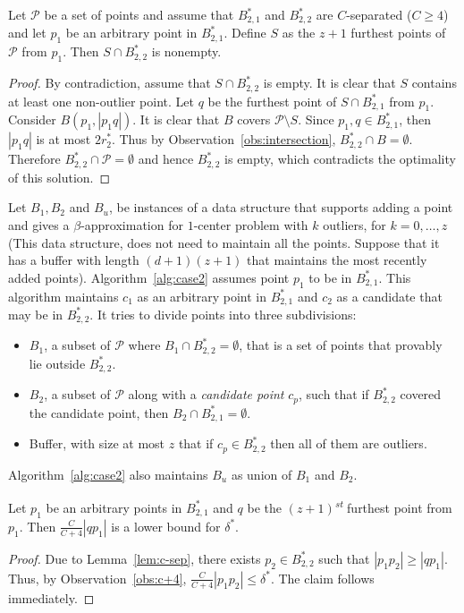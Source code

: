 \documentclass[envcountsame]{cls/cccg15}
\newcommand{\st}{\textsuperscript{\textit{st}} }
\newcommand{\card}[1]{\left|{#1}\right|}
\newcommand{\lee}{\leqslant}
\newcommand{\gee}{\geqslant}
\renewcommand{\le}{\lee}
\renewcommand{\ge}{\gee}
\begin{document}
\begin{lemma}
\label{lem:c-sep}
Let $\mathcal{P}$ be a set of points and assume that $B_{2,1}^*$ and $B_{2,2}^*$ are $C$-separated ($C \ge 4$) and let $p_1$ be an arbitrary point in $B_{2,1}^*$. Define $S$ as the $z+1$ furthest points of $\mathcal{P}$ from $p_1$. Then $S \cap B_{2,2}^*$ is nonempty.
\end{lemma}
\begin{proof}
By contradiction, assume that $S \cap B_{2,2}^*$ is empty. It is clear that $S$ contains at least one non-outlier point. Let $q$ be the furthest point of $S \cap B_{2,1}^*$ from $p_1$. Consider $B(p_1, \card{p_1q})$. It is clear that $B$ covers $\mathcal{P} \setminus S$. Since $p_1, q \in B_{2,1}^*$, then $\card{p_1q}$ is at most $2r_2^*$. Thus by Observation~\ref{obs:intersection}, $B_{2,2}^* \cap B = \emptyset$. Therefore $B_{2,2}^* \cap \mathcal{P} = \emptyset$ and hence $B_{2,2}^*$ is empty, which contradicts the optimality of this solution.
\end{proof}

Let $B_1, B_2$ and $B_u$, be instances of a data structure that supports adding a point and gives a $\beta$-approximation for $1$-center problem with $k$ outliers, for $k=0,\dots,z$ (This data structure, does not need to maintain all the points. Suppose that it has a buffer with length $(d+1)(z+1)$ that maintains the most recently added points). Algorithm~\ref{alg:case2} assumes point $p_1$ to be in $B_{2,1}^*$. This algorithm maintains $c_1$ as an arbitrary point in $B_{2,1}^*$ and $c_2$ as a candidate that may be in $B_{2,2}^*$. It tries to divide points into three subdivisions:
\begin{itemize}
\item $B_1$, a subset of $\mathcal{P}$ where $B_1 \cap B_{2,2}^* = \emptyset$, that is a set of points that provably lie outside $B_{2, 2}^*$.
\item $B_2$, a subset of $\mathcal{P}$ along with a \emph{candidate point} $c_p$, such that if $B_{2, 2}^*$ covered the candidate point, then $B_2 \cap B_{2, 1}^* = \emptyset$.
\item Buffer, with size at most $z$ that if $c_p \in B_{2, 2}^*$ then all of them are outliers.
\end{itemize}
Algorithm~\ref{alg:case2} also maintains $B_u$ as union of $B_1$ and $B_2$.


\begin{lemma}
\label{lem:(z+1)-furthest}
Let $p_1$ be an arbitrary points in $B_{2,1}^{*}$ and $q$ be the $(z+1)$\st furthest point from $p_1$. Then $\frac{C}{C+4}\card{qp_1}$ is a lower bound for $\delta^*$.
\end{lemma}
\begin{proof}
Due to Lemma~\ref{lem:c-sep}, there exists $p_2 \in B_{2,2}^*$ such that $\card{p_1p_2} \ge \card{qp_1}$. Thus, by Observation~\ref{obs:c+4}, $\frac{C}{C+4} \card{p_1p_2} \le \delta^*$. The claim follows immediately.
\end{proof}
\end{document}
